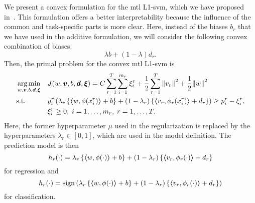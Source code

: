 We present a convex formulation for the \acrshort{mtl} L1-\acrshort{svm}, which we have proposed in~\cite{RuizAD19}. This formulation offers a better interpretability because the influence of the common and task-specific parts is more clear. 
%
Here, instead of the biases $b_r$ that we have used in the additive formulation, we will consider the following convex combination of biases:
$$ \lambda b + (1 - \lambda) d_r .$$  
%
Then, the primal problem for the convex \acrshort{mtl} L1-\acrshort{svm} is
\begin{equation}\label{eq:svmmtl_primal_convex}
    \begin{aligned}
    & \argmin_{w, \fv{v}, b, \fv{d}, \fv{\xi}}
    & & {J({w}, \fv{v}, b, \fv{d}, \fv{\xi}) = C \sum_{r= 1}^T \sum_{i=1}^{m_r} {\xi_{i}^r} + \frac{1}{2} \sum_{r= 1}^T{\norm{{v}_r}^2} + \frac{1}{2} {\norm{{w}}}^2} \\
    & \text{s.t.}
    & & y_{i}^r \left(\lambda_r \left\lbrace \dotp{w}{\phi(x_{i}^r)} + b  \right\rbrace + (1 - \lambda_r) \left\lbrace \dotp{{v}_r}{\phi_r(x_{i}^r)} + d_r \right\rbrace  \right) \geq p_{i}^r - \xi_{i}^r ,  \\
    & & & \xi_{i}^r \geq 0, \;  i=1 , \dotsc , m_r, \;  r= 1,\dotsc, T  . \\
    \end{aligned}
\end{equation}
Here, the former hyperparameter $\mu$ used in the regularization is replaced by the hyperparameters $\lambda_r \in [0, 1]$, which are used in the model definition. The prediction model is then
\begin{equation}
    \nonumber
    h_r({\cdot}) = \lambda_r \left\lbrace \bm{\left\langle} w, \phi(\cdot) \bm{\right\rangle} + b  \right\rbrace + (1 - \lambda_r) \left\lbrace \bm{\left\langle} {v}_r, \phi_r(\cdot) \bm{\right\rangle} + d_r \right\rbrace
\end{equation}
for regression and 
\begin{equation}
    \nonumber
    h_r({\cdot}) = \operatorname{sign}{ \left(\lambda_r \left\lbrace \bm{\left\langle} w, \phi(\cdot) \bm{\right\rangle} + b  \right\rbrace + (1 - \lambda_r) \left\lbrace \bm{\left\langle} {v}_r, \phi_r(\cdot) \bm{\right\rangle} + d_r \right\rbrace \right)}
\end{equation}
for classification.
%

